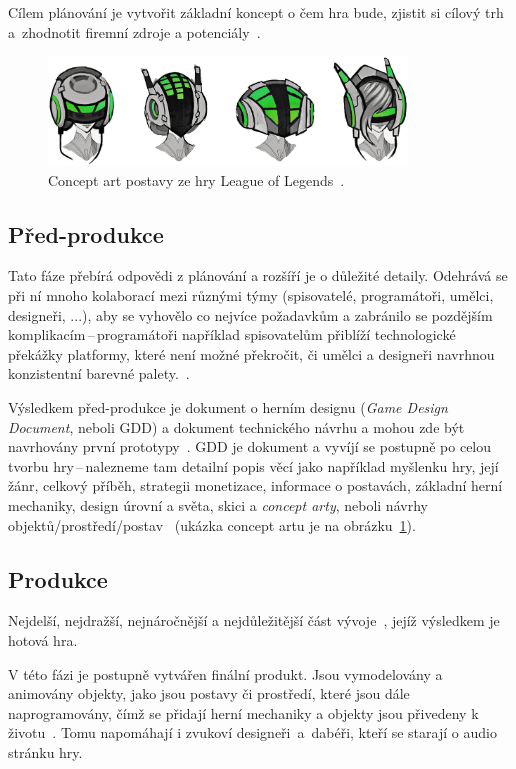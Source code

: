 Cílem plánování je vytvořit základní koncept o čem hra bude, zjistit si cílový trh a~zhodnotit firemní zdroje a potenciály~\cite{novak2011game}.

\begin{figure}[hb]
    \centering
	\includegraphics[width=0.85\textwidth]{obrazky-figures/ch2/concept_art.png}
	\caption{Concept art postavy ze hry League of Legends~\cite{artLOLvol1}.}
	\label{fig:concept_art_lol}
\end{figure}

\subsection*{Před-produkce}
Tato fáze přebírá odpovědi z plánování a rozšíří je o důležité detaily. Odehrává se při ní mnoho kolaborací mezi různými týmy (spisovatelé, programátoři, umělci, designeři, ...), aby se vyhovělo co nejvíce požadavkům a zabránilo se pozdějším komplikacím\,--\,programátoři například spisovatelům přiblíží technologické překážky platformy, které není možné překročit, či umělci a designeři navrhnou konzistentní barevné palety.~\cite{g2_game_development}.

Výsledkem před-produkce je dokument o herním designu (\textit{Game Design Document}, neboli GDD) a dokument technického návrhu a mohou zde být navrhovány první prototypy~\cite{novak2011game}. GDD je  dokument a vyvíjí se postupně po celou tvorbu hry\,--\,nalezneme tam detailní popis věcí jako například myšlenku hry, její žánr, celkový příběh, strategii monetizace, informace o postavách, základní herní mechaniky, design úrovní a světa, skici a \textit{concept arty}, neboli návrhy objektů/prostředí/postav~\cite{CG_Spectrum_GAMEDEVELOPMENT} (ukázka concept artu je na obrázku~\ref{fig:concept_art_lol}).

\subsection*{Produkce}
Nejdelší, nejdražší, nejnáročnější a nejdůležitější část vývoje~\cite{g2_game_development}, jejíž výsledkem je hotová hra. 

V této fázi je postupně vytvářen finální produkt. Jsou vymodelovány a animovány objekty, jako jsou postavy či prostředí, které jsou dále naprogramovány, čímž se přidají herní mechaniky a objekty jsou přivedeny k životu~\cite{GameMaker_development}. Tomu napomáhají i zvukoví designeři~a~dabéři, kteří se starají o audio stránku hry.

